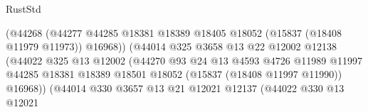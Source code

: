 \begin{lexlean}{RustStd}
\begin{coremodule}
                                              (@44268
                                                (@44277
                                                  @44285
                                                  @18381
                                                  @18389
                                                  @18405
                                                  @18052
                                                  (@15837 (@18408 @11979 @11973))
                                                  @16968))
                                              (@44014
                                                @325
                                                @3658
                                                @13
                                                @22
                                                @12002
                                                @12138
                                                (@44022
                                                  @325
                                                  @13
                                                  @12002
                                                  (@44270
                                                    @93
                                                    @24
                                                    @13
                                                    @4593
                                                    @4726
                                                    @11989
                                                    @11997
                                                    @44285
                                                    @18381
                                                    @18389
                                                    @18501
                                                    @18052
                                                    (@15837 (@18408 @11997 @11990))
                                                    @16968))
                                                (@44014
                                                  @330
                                                  @3657
                                                  @13
                                                  @21
                                                  @12021
                                                  @12137
                                                  (@44022
                                                    @330
                                                    @13
                                                    @12021

\end{coremodule}
\end{lexlean}

